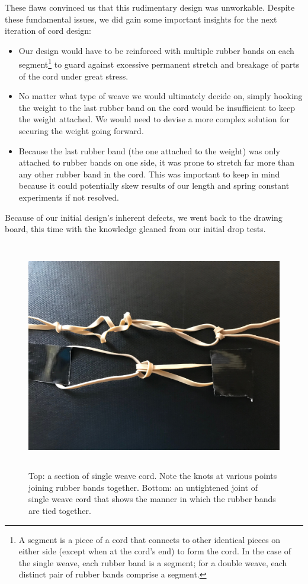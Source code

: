 \documentclass[12pt]{article}
\begin{document}
These flaws convinced us that this rudimentary design was unworkable. Despite these fundamental issues, we did gain some important insights for the next iteration of cord design:
\begin{itemize}
    \item Our design would have to be reinforced with multiple rubber bands on each segment\footnote{A segment is a piece of a cord that connects to other identical pieces on either side (except when at the cord's end) to form the cord. In the case of the single weave, each rubber band is a segment; for a double weave, each distinct pair of rubber bands comprise a segment.} to guard against excessive permanent stretch and breakage of parts of the cord under great stress.
    \item No matter what type of weave we would ultimately decide on, simply hooking the weight to the last rubber band on the cord would be insufficient to keep the weight attached. We would need to devise a more complex solution for securing the weight going forward.
    \item Because the last rubber band (the one attached to the weight) was only attached to rubber bands on one side, it was prone to stretch far more than any other rubber band in the cord. This was important to keep in mind because it could potentially skew results of our length and spring constant experiments if not resolved.
\end{itemize}

Because of our initial design's inherent defects, we went back to the drawing board, this time with the knowledge gleaned from our initial drop tests.

\begin{figure}
    \centering
    \includegraphics[width=16cm,height=10cm]{singleweave}
    \caption{Top: a section of single weave cord. Note the knots at various points joining rubber bands together. Bottom: an untightened joint of single weave cord that shows the manner in which the rubber bands are tied together.}
    \label{fig:singleWeave}
\end{figure}
\end{document}
